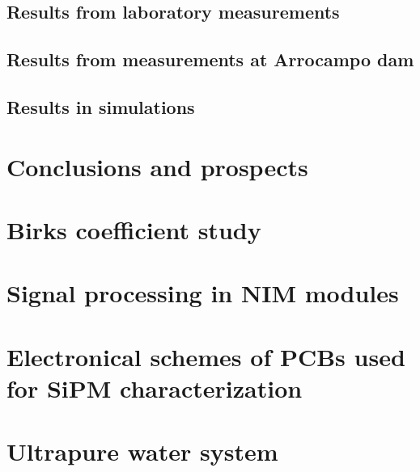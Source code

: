 \documentclass[12pt,a4paper]{book}
\begin{document}
	\section{Results from laboratory measurements}
	\newpage
		
	\section[Results in Arrocampo dam]{Results from measurements at Arrocampo dam}\label{sec:ResultsArrocampo}
	\newpage
	
	\section{Results in simulations}\label{sec:ResultsSimulations}
	\newpage		

\chapter{Conclusions and prospects}  \label{chap:Conclusions}

\newpage


\appendix
\appendixpage
\noappendicestocpagenum
\addappheadtotoc

\chapter{Birks coefficient study}\label{App:BirksA}


\chapter{Signal processing in NIM modules}\label{App:ElectronicModulesNIM}


\chapter{Electronical schemes of PCBs used for SiPM characterization}\label{App:ElectronicalSchemesSiPMPCBs}


\chapter{Ultrapure water system }\label{App:UltraPureWaterSystem}



\end{document}
